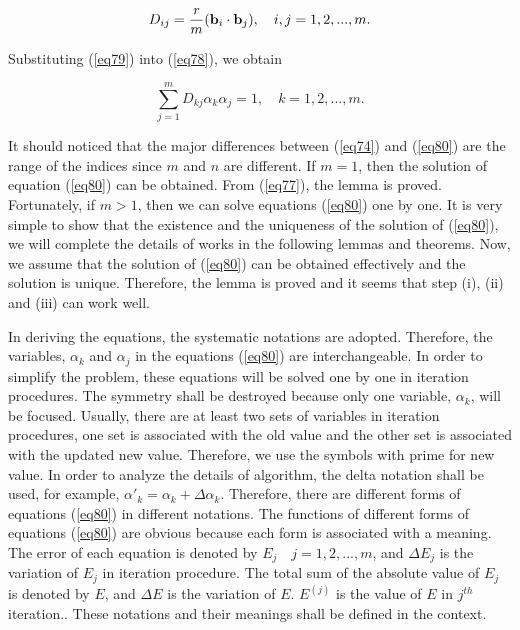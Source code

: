 \documentclass [18pt]{article}
\begin{document}
\begin{equation}
\label{eq79}
D_{ij} = \frac{r}{m}({\rm {\bf b}}_i \cdot {\rm {\bf b}}_j ),
\quad
i,j = 1,2,...,m.
\end{equation}



Substituting (\ref{eq79}) into (\ref{eq78}), we obtain


\begin{equation}
\label{eq80}
\sum\limits_{j = 1}^m {D_{kj} \alpha _k \alpha _j = 1} ,
\quad
k = 1,2,...,m.
\end{equation}



It should noticed that the major differences between (\ref{eq74}) and (\ref{eq80}) are the
range of the indices since $m$ and $n$ are different. If $m = 1$, then the
solution of equation (\ref{eq80}) can be obtained. From (\ref{eq77}), the lemma is proved.
Fortunately, if $m > 1$, then we can solve equations (\ref{eq80}) one by one. It is
very simple to show that the existence and the uniqueness of the solution of
(\ref{eq80}), we will complete the details of works in the following lemmas and
theorems. Now, we assume that the solution of (\ref{eq80}) can be obtained
effectively and the solution is unique. Therefore, the lemma is proved and
it seems that step (i), (ii) and (iii) can work well.

In deriving the equations, the systematic notations are adopted. Therefore,
the variables, $\alpha _k $ and $\alpha _j $ in the equations (\ref{eq80}) are
interchangeable. In order to simplify the problem, these equations will be
solved one by one in iteration procedures. The symmetry shall be destroyed
because only one variable, $\alpha _k $, will be focused. Usually, there are
at least two sets of variables in iteration procedures, one set is
associated with the old value and the other set is associated with the
updated new value. Therefore, we use the symbols with prime for new value.
In order to analyze the details of algorithm, the delta notation shall be
used, for example, $\alpha '_k = \alpha _k + \Delta \alpha _k $. Therefore,
there are different forms of equations (\ref{eq80}) in different notations. The
functions of different forms of equations (\ref{eq80}) are obvious because each form
is associated with a meaning. The error of each equation is denoted by $E_j
 \quad j = 1,2,...,m$, and $\Delta E_j $ is the variation of $E_j $ in iteration
procedure. The total sum of the absolute value of $E_j $ is denoted by $E$,
and $\Delta E$ is the variation of $E$. $E^{(j)}$ is the value of $E$ in
$j^{th}$ iteration.. These notations and their meanings shall be defined in
the context.
\end{document}
